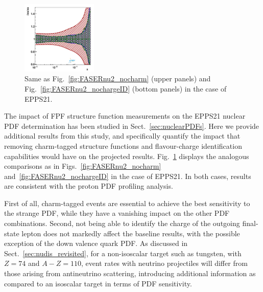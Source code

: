\begin{figure}[htbp]
	\includegraphics[width=0.32\textwidth]{plots/nuclear_fasernu2/nochargediscrimination/statOnly_FASERv2_q2_10000_pdf_s_ratio.pdf}
	\caption{Same as Fig.~\ref{fig:FASERnu2_nocharm} (upper panels)
		and  Fig.~\ref{fig:FASERnu2_nochargeID} (bottom panels) in the case of EPPS21.
	}
	\label{fig:EPPS21_nochargeID}
\end{figure}

The impact of FPF structure function measurements on the
EPPS21 nuclear PDF determination has been studied in Sect.~\ref{sec:nuclearPDFs}.
%
Here we provide additional results from this study, and specifically quantify the impact
that removing charm-tagged structure functions and flavour-charge
identification capabilities would have on the projected results.
%
Fig.~\ref{fig:EPPS21_nochargeID} displays
the analogous comparisons as in Figs.~\ref{fig:FASERnu2_nocharm}
and~\ref{fig:FASERnu2_nochargeID} in the case of EPPS21.
%
In both cases, results are consistent with the proton PDF profiling analysis.

First of all, charm-tagged events are essential to achieve the best
sensitivity to the strange PDF, while they have a vanishing impact on the
other PDF combinations.
%
Second, not being able to identify the charge of the outgoing final-state lepton
does not markedly affect  the baseline results, with the possible exception
of the down valence quark PDF.
%
As discussed in Sect.~\ref{sec:nudis_revisited}, for a non-isoscalar target
such as tungsten, with $Z=74$ and $A-Z=110$, event rates with neutrino projectiles
will differ from those arising from antineutrino scattering, introducing
additional information as compared to an isoscalar target in terms of PDF sensitivity.


